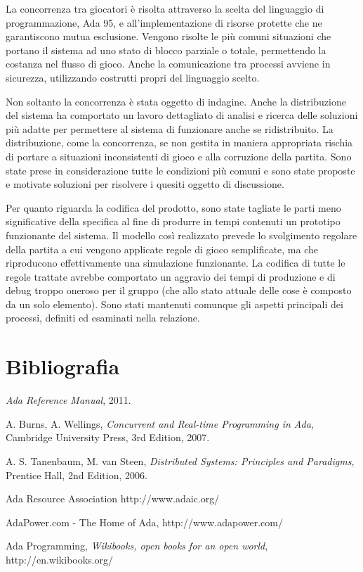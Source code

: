 \documentclass[aps,letterpaper,10pt]{article}
\begin{document}
La concorrenza tra giocatori \`e risolta attraverso la scelta del linguaggio di programmazione, Ada 95, e
all'implementazione di risorse protette che ne garantiscono mutua esclusione. Vengono risolte le pi\`u comuni situazioni
che portano il sistema ad uno stato di blocco parziale o totale, permettendo la costanza nel flusso di gioco. Anche la
comunicazione tra processi avviene in sicurezza, utilizzando costrutti propri del linguaggio scelto. \vspace{3mm}

Non soltanto la concorrenza \`e stata oggetto di indagine. Anche la distribuzione del sistema ha comportato un lavoro
dettagliato di analisi e ricerca delle soluzioni pi\`u adatte per permettere al sistema di funzionare anche se
ridistribuito. La distribuzione, come la concorrenza, se non gestita in maniera appropriata rischia di portare a
situazioni inconsistenti di gioco e alla corruzione della partita. Sono state prese in considerazione tutte le
condizioni pi\`u comuni e sono state proposte e motivate soluzioni per risolvere i quesiti oggetto di discussione.
\vspace{3mm}

Per quanto riguarda la codifica del prodotto, sono state tagliate le parti meno significative della specifica al fine di
produrre in tempi contenuti un prototipo funzionante del sistema. Il modello cos\`i realizzato prevede lo svolgimento
regolare della partita a cui vengono applicate regole di gioco semplificate, ma che riproducono effettivamente una
simulazione funzionante. La codifica di tutte le regole trattate avrebbe comportato un aggravio dei tempi di produzione
e di debug troppo oneroso per il gruppo (che allo stato attuale delle cose \`e composto da un solo elemento). Sono stati
mantenuti comunque gli aspetti principali dei processi, definiti ed esaminati nella relazione.

\newpage

\section{Bibliografia}

\begin{thebibliography}{99}

\emph{Ada Reference Manual},
2011.

A. Burns, A. Wellings,
\emph{Concurrent and Real-time Programming in Ada},
Cambridge University Press,
3rd Edition,
2007.

A. S. Tanenbaum, M. van Steen,
\emph{Distributed Systems: Principles and Paradigms},
Prentice Hall,
2nd Edition,
2006.

Ada Resource Association
http://www.adaic.org/

AdaPower.com - The Home of Ada,
http://www.adapower.com/

Ada Programming, 
\emph{Wikibooks, open books for an open world}, 
http://en.wikibooks.org/

\end{thebibliography}
\end{document}
